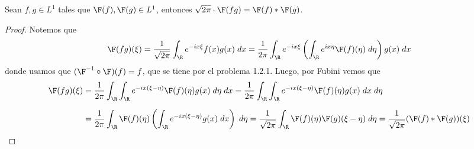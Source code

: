 \documentclass{article}
\begin{document}
\begin{enumerate}
    \begin{lema}
        Sean $f,g\in L^{1}$ tales que $\F(f),\F(g)\in L^{1}$, entonces 
        $\sqrt{2\pi}\cdot\F(fg)=\F(f)*\F(g)$.
    \end{lema}
\begin{proof}
    Notemos que
    \begin{equation*}
        \F(fg)(\xi)=\frac{1}{\sqrt{2\pi}}\int_{\R}e^{-ix\xi}f(x)g(x)\hspace{1mm}dx
        =\frac{1}{2\pi}\int_{\R}e^{-ix\xi}
        \left(\int_{\R}e^{ix\eta}\F(f)(\eta)\hspace{1mm}d\eta\right)g(x)\hspace{1mm}dx
    \end{equation*}
    donde usamos que $(\F^{-1}\circ\F)(f)=f$, que se tiene por el problema 1.2.1. Luego, por 
    Fubini vemos que
    \begin{align*}
        \F(fg)(\xi) &= \frac{1}{2\pi}\int_{\R}\int_{\R}e^{-ix(\xi-\eta)}
        \F(f)(\eta)g(x)\hspace{1mm}d\eta\hspace{1mm}dx
        =\frac{1}{2\pi}\int_{\R}\int_{\R}e^{-ix(\xi-\eta)}
        \F(f)(\eta)g(x)\hspace{1mm}dx\hspace{1mm}d\eta \\[2mm]
        &= \frac{1}{2\pi}\int_{\R}\F(f)(\eta)
        \left(\int_{\R}e^{-ix(\xi-\eta)}g(x)\hspace{1mm}dx\right)\hspace{1mm}d\eta
        =\frac{1}{\sqrt{2\pi}}\int_{\R}\F(f)(\eta)\F(g)(\xi-\eta)\hspace{1mm}d\eta
        =\frac{1}{\sqrt{2\pi}}(\F(f)*\F(g))(\xi)
    \end{align*}
\end{proof}


\end{enumerate}
\end{document}
